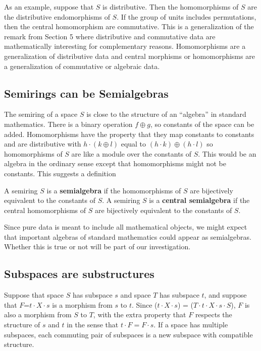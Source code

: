 \documentclass[11pt]{article}
\begin{document}
As an example, suppose that $S$ is distributive.  Then the homomorphisms of $S$ are the distributive endomorphisms of $S$.  If the group of units 
includes permutations, then the central homomorphism are commutative.  This is a generalization of the remark from Section 5 where distributive and 
commutative data are mathematically interesting for complementary reasons.  Homomorphisms are a generalization of distributive data and central 
morphisms or homomorphisms are a generalization of commutative or algebraic data.  

\subsection{Semirings can be Semialgebras} 

The semiring of a space $S$ is close to the structure of an ``algebra'' in standard mathematics.  There is a binary operation $f\oplus g$, so 
constants of the space can be added.  Homomorphisms have the property that they map constants to constants and are distributive with 
$h\cdot (k\oplus l)$ equal to $(h\cdot k)\oplus (h\cdot l)$ so homomorphisms of $S$ are like a module over the constants of $S$.  This would 
be an algebra in the ordinary sense except that homomorphisms might not be constants.  This suggests a definition 

\begin{definition}
A semiring $S$ is a {\bf semialgebra} if the homomorphisms of $S$ are bijectively equivalent to the constants of $S$.
A semiring $S$ is a {\bf central semialgebra} if the central homomorphisms of $S$ are bijectively equivalent to the constants of $S$.
\end{definition}
\noindent Since pure data is meant to include all mathematical objects, we might expect that important algebras of standard 
mathematics could appear as semialgebras.  Whether this is true or not will be part of our investigation. 

\subsection{Subspaces are substructures} 

Suppose that space $S$ has subspace $s$ and space $T$ has subspace $t$, and suppose that $F$=$t\cdot X\cdot s$ is a morphism from $s$ to $t$.   
Since ($t\cdot X\cdot s$) = ($T\cdot t \cdot X\cdot s\cdot S$), 
$F$ is also a morphism from $S$ to $T$, with the extra property that $F$ respects the structure of $s$ and $t$ in the sense that $t\cdot F=F\cdot s$.  
If a space has multiple subspaces, each commuting pair of subspaces is a new subspace with compatible structure. 
\end{document}
